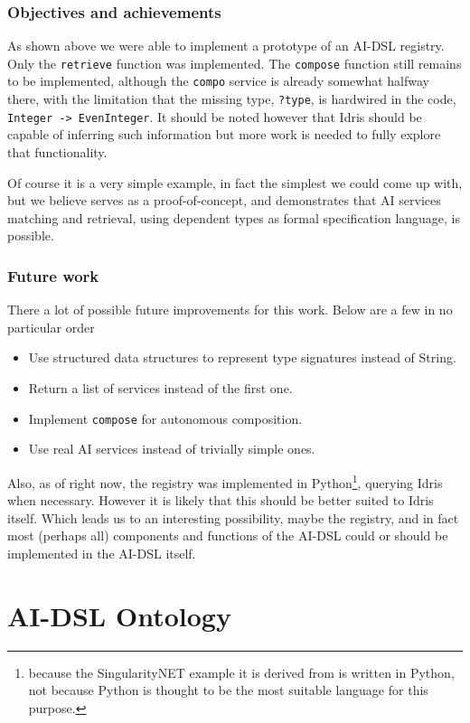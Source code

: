 \documentclass[]{report}
\begin{document}
\subsection{Objectives and achievements}

As shown above we were able to implement a prototype of an AI-DSL
registry.  Only the \texttt{retrieve} function was implemented.  The
\texttt{compose} function still remains to be implemented, although
the \texttt{compo} service is already somewhat halfway there, with the
limitation that the missing type, \texttt{?type}, is hardwired in the
code, \texttt{Integer -> EvenInteger}.  It should be noted however
that Idris should be capable of inferring such information but more
work is needed to fully explore that functionality.

Of course it is a very simple example, in fact the simplest we could
come up with, but we believe serves as a proof-of-concept, and
demonstrates that AI services matching and retrieval, using dependent
types as formal specification language, is possible.

\subsection{Future work}

There a lot of possible future improvements for this work.  Below are
a few in no particular order
\begin{itemize}
\item Use structured data structures to represent type signatures
  instead of String.
\item Return a list of services instead of the first one.
\item Implement \texttt{compose} for autonomous composition.
\item Use real AI services instead of trivially simple ones.
\end{itemize}

Also, as of right now, the registry was implemented in
Python\footnote{because the SingularityNET example it is derived from
is written in Python, not because Python is thought to be the most
suitable language for this purpose.}, querying Idris when necessary.
However it is likely that this should be better suited to Idris
itself.  Which leads us to an interesting possibility, maybe the
registry, and in fact most (perhaps all) components and functions of
the AI-DSL could or should be implemented in the AI-DSL itself.

\chapter{AI-DSL Ontology}
\label{chap:aidsl_ontology}
\end{document}
